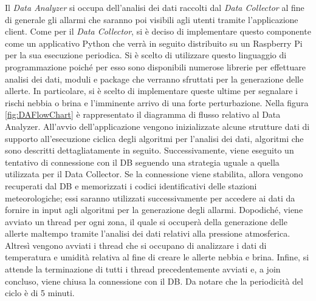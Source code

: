Il \textit{Data Analyzer} si occupa dell'analisi dei dati raccolti dal \textit{Data Collector} al fine di generale gli allarmi che saranno poi visibili agli utenti tramite l'applicazione client. Come per il \textit{Data Collector}, si è deciso di implementare questo componente come un applicativo Python che verrà in seguito distribuito su un Raspberry Pi per la sua esecuzione periodica. Si è scelto di utilizzare questo linguaggio di programmazione poiché per esso sono disponibili numerose librerie per effettuare analisi dei dati, moduli e package che verranno sfruttati per la generazione delle allerte. In particolare, si è scelto di implementare queste ultime per segnalare i rischi nebbia o brina e l'imminente arrivo di una forte perturbazione. Nella figura \ref{fig:DAFlowChart} è rappresentato il diagramma di flusso relativo al Data Analyzer. All'avvio dell'applicazione vengono inizializzate alcune strutture dati di supporto all'esecuzione ciclica degli algoritmi per l'analisi dei dati, algoritmi che sono descritti dettagliatamente in seguito. Successivamente, viene eseguito un tentativo di connessione con il DB seguendo una strategia uguale a quella utilizzata per il Data Collector. Se la connessione viene stabilita, allora vengono recuperati dal DB e memorizzati i codici identificativi delle stazioni meteorologiche; essi saranno utilizzati successivamente per accedere ai dati da fornire in input agli algoritmi per la generazione degli allarmi. Dopodiché, viene avviato un thread per ogni zona, il quale si occuperà della generazione delle allerte maltempo tramite l'analisi dei dati relativi alla pressione atmosferica. Altresì vengono avviati i thread che si occupano di analizzare i dati di temperatura e umidità relativa al fine di creare le allerte nebbia e brina. Infine, si attende la terminazione di tutti i thread precedentemente avviati e, a join concluso, viene chiusa la connessione con il DB. Da notare che la periodicità del ciclo è di 5 minuti. 

